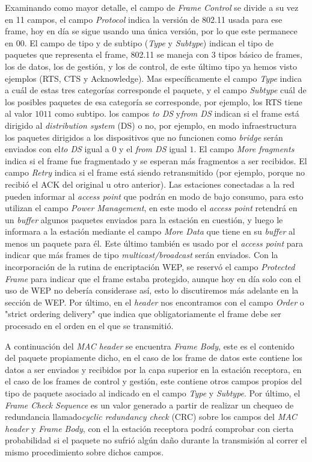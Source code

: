 \documentclass[10pt,a4paper]{article}
\begin{document}
Examinando como mayor detalle, el campo de \textit{Frame Control} se divide a su vez en 11 campos, el campo \textit{Protocol} indica la versión de 802.11 usada para ese frame, hoy en día se sigue usando una única versión, por lo que este permanece en $00$. El campo de tipo y de subtipo (\textit{Type} y \textit{Subtype}) indican el tipo de paquetes que representa el frame, 802.11 se maneja con 3 tipos básico de frames, los de datos, los de gestión, y los de control, de este último tipo ya hemos visto ejemplos (RTS, CTS y Acknowledge). Mas específicamente el campo \textit{Type} indica a cuál de estas tres categorías corresponde el paquete, y el campo \textit{Subtype} cuál de los posibles paquetes de esa categoría se corresponde, por ejemplo, los RTS tiene al valor $1011$ como subtipo. los campos \textit{to DS} y\textit{from DS} indican si el frame está dirigido al \textit{distribution system} (DS) o no, por ejemplo, en modo infraestructura los paquetes dirigidos a los dispositivos que no funcionen como \textit{bridge} serán enviados con el\textit{to DS} igual a $0$ y el \textit{from DS} igual $1$. El campo \textit{More fragments} indica si el frame fue fragmentado y se esperan más fragmentos a ser recibidos. El campo \textit{Retry} indica si el frame está siendo retransmitido (por ejemplo, porque no recibió el ACK del original u otro anterior). Las estaciones conectadas a la red pueden informar al \textit{access point} que podrán en modo de bajo consumo, para esto utilizan el campo \textit{Power Management}, en este modo el \textit{access point} retendrá en un \textit{buffer} algunos paquetes enviados para la estación en cuestión, y luego le informara a la estación mediante el campo \textit{More Data} que tiene en su \textit{buffer} al menos un paquete para él. Este último también es usado por el \textit{access point} para indicar que más frames de tipo \textit{multicast/broadcast} serán enviados. Con la incorporación de la rutina de encriptación WEP, se reservó el campo \textit{Protected Frame} para indicar que el frame estaba protegido, aunque hoy en día solo con el uso de WEP no debería considerase así, esto lo discutiremos más adelante en la sección de WEP. Por último, en el \textit{header} nos encontramos con el campo \textit{Order} o "strict ordering delivery" que indica que obligatoriamente el frame debe ser procesado en el orden en el que se transmitió.

A continuación del \textit{MAC header} se encuentra \textit{Frame Body}, este es el contenido del paquete propiamente dicho, en el caso de los frame de datos este contiene los datos a ser enviados y recibidos por la capa superior en la estación receptora, en el caso de los frames de control y gestión, este contiene otros campos propios del tipo de paquete asociado al indicado en el campo \textit{Type} y \textit{Subtype}. Por último, el \textit {Frame Check Sequence} es un valor generado a partir de realizar un chequeo de redundancia llamado\textit{cyclic redundancy check} (CRC) sobre los campos del \textit{MAC header} y \textit{Frame Body}, con el la estación receptora podrá comprobar con cierta probabilidad si el paquete no sufrió algún daño durante la transmisión al correr el mismo procedimiento sobre dichos campos.
\end{document}
